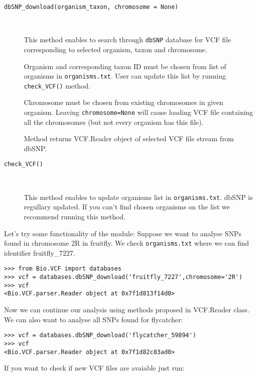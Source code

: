 \begin{description}
  \item[\texttt{dbSNP\_download(organism\_taxon, chromosome = None)}] \

    This method enables to search through \verb|dbSNP| database for VCF file corresponding to selected
    organism, taxon and chromosome.
    
    Organism and corresponding taxon ID must be chosen from list of organisms in \verb|organisms.txt|. User can update this list by running
    \verb|check_VCF()| method.
    
    Chromosome must be chosen from existing chromosomes in given organism. Leaving \verb|chromosome=None| will cause loading VCF file
    containing all the chromosomes (but not every organism has this file).
    
    Method returns VCF.Reader object of selected VCF file stream from dbSNP.
    
    \item[\texttt{check\_VCF()}] \
    
    This method enables to update organisms list in \verb|organisms.txt|. dbSNP is regullary updated. If you can't find chosen organisms on 
    the list we recommend running this method. 

\end{description}

\noindent Let's try some functionality of the module:
\vspace{5mm}
\noindent Suppose we want to analyse SNPs found in chromosome 2R in fruitfly. We check \verb|organisms.txt| where we can find identifier 
fruitfly\_7227.

\begin{verbatim}
>>> from Bio.VCF import databases
>>> vcf = databases.dbSNP_download('fruitfly_7227',chromosome='2R')
>>> vcf
<Bio.VCF.parser.Reader object at 0x7f1d813f14d0>
\end{verbatim}

\noindent Now we can continue our analysis using methods proposed in VCF.Reader class.
\vspace{5mm}
\noindent We can also want to analyse all SNPs found for flycatcher:

\begin{verbatim}
>>> vcf = databases.dbSNP_download('flycatcher_59894')
>>> vcf
<Bio.VCF.parser.Reader object at 0x7f1d82c83ad0>
\end{verbatim}

\noindent If you want to check if new VCF files are avaiable just run:

